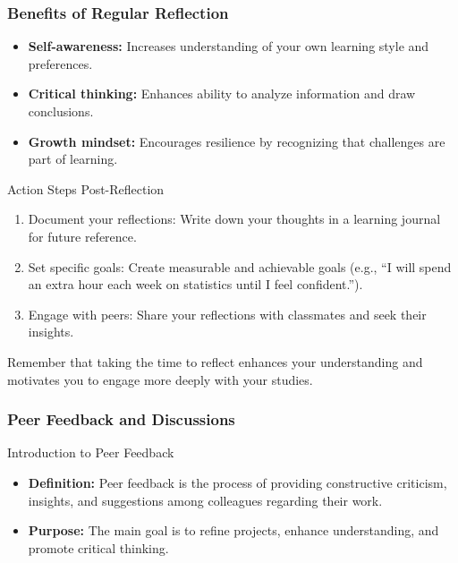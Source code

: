 \documentclass[aspectratio=169]{beamer}
\begin{document}
\begin{frame}[fragile]
    \frametitle{Benefits of Regular Reflection}
    
    \begin{itemize}
        \item \textbf{Self-awareness:} Increases understanding of your own learning style and preferences.
        \item \textbf{Critical thinking:} Enhances ability to analyze information and draw conclusions.
        \item \textbf{Growth mindset:} Encourages resilience by recognizing that challenges are part of learning.
    \end{itemize}
    
    \begin{block}{Action Steps Post-Reflection}
        \begin{enumerate}
            \item Document your reflections: Write down your thoughts in a learning journal for future reference.
            \item Set specific goals: Create measurable and achievable goals (e.g., ``I will spend an extra hour each week on statistics until I feel confident.'').
            \item Engage with peers: Share your reflections with classmates and seek their insights.
        \end{enumerate}
    \end{block}
    
    Remember that taking the time to reflect enhances your understanding and motivates you to engage more deeply with your studies.
\end{frame}

\begin{frame}[fragile]
    \frametitle{Peer Feedback and Discussions}
    \begin{block}{Introduction to Peer Feedback}
        \begin{itemize}
            \item \textbf{Definition:} Peer feedback is the process of providing constructive criticism, insights, and suggestions among colleagues regarding their work.
            \item \textbf{Purpose:} The main goal is to refine projects, enhance understanding, and promote critical thinking.
        \end{itemize}
    \end{block}
\end{frame}
\end{document}
